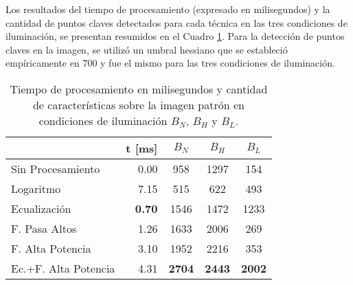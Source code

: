 Los resultados del tiempo de procesamiento (expresado en milisegundos) y la cantidad de puntos claves detectados para cada técnica en las tres condiciones de iluminación, se presentan resumidos en el Cuadro \ref{tabla:tiempos_realce_iluminacion}. Para la detección de puntos claves en la imagen, se utilizó un umbral hessiano que se estableció empíricamente en $700$ y fue el mismo para las tres condiciones de iluminación.
\begin{table}[htbp]
\caption[Tiempo de procesamiento en milisegundos y cantidad de características sobre la imagen patrón en diferentes condiciones de iluminación]{Tiempo de procesamiento en milisegundos y cantidad de características sobre la imagen patrón en condiciones de iluminación $B_{N}$, $B_{H}$ y $B_{L}$.}
\begin{tabular}{|l|r|c|c|c|}
\hline
 & \multicolumn{1}{c|}{\textbf{t [ms]}} & \textbf{$B_{N}$} & \textbf{$B_{H}$} & \textbf{$B_{L}$}\\ \hline
Sin Procesamiento & 0.00 &  958 & 1297 & 154\\ \hline
Logaritmo & 7.15 & 515 & 622 & 493\\ \hline
Ecualización & \textbf{0.70} & 1546 & 1472 & 1233\\ \hline
F. Pasa Altos & 1.26 &  1633 & 2006 & 269\\ \hline
F. Alta Potencia & 3.10 & 1952 & 2216 & 353\\ \hline
Ec.+F. Alta Potencia & 4.31 & \textbf{2704} & \textbf{2443} & \textbf{2002}\\ \hline
\end{tabular}
\label{tabla:tiempos_realce_iluminacion}
\end{table}
%
